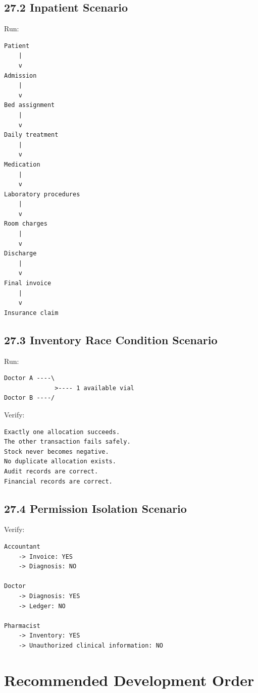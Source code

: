 \documentclass[11pt,a4paper]{article}
\begin{document}
\subsection{27.2 Inpatient Scenario}

Run:

\begin{lstlisting}
Patient
    |
    v
Admission
    |
    v
Bed assignment
    |
    v
Daily treatment
    |
    v
Medication
    |
    v
Laboratory procedures
    |
    v
Room charges
    |
    v
Discharge
    |
    v
Final invoice
    |
    v
Insurance claim
\end{lstlisting}

\subsection{27.3 Inventory Race Condition Scenario}

Run:

\begin{lstlisting}
Doctor A ----\
              >---- 1 available vial
Doctor B ----/
\end{lstlisting}

Verify:

\begin{lstlisting}
Exactly one allocation succeeds.
The other transaction fails safely.
Stock never becomes negative.
No duplicate allocation exists.
Audit records are correct.
Financial records are correct.
\end{lstlisting}

\subsection{27.4 Permission Isolation Scenario}

Verify:

\begin{lstlisting}
Accountant
    -> Invoice: YES
    -> Diagnosis: NO

Doctor
    -> Diagnosis: YES
    -> Ledger: NO

Pharmacist
    -> Inventory: YES
    -> Unauthorized clinical information: NO
\end{lstlisting}

\section{Recommended Development Order}
\end{document}
